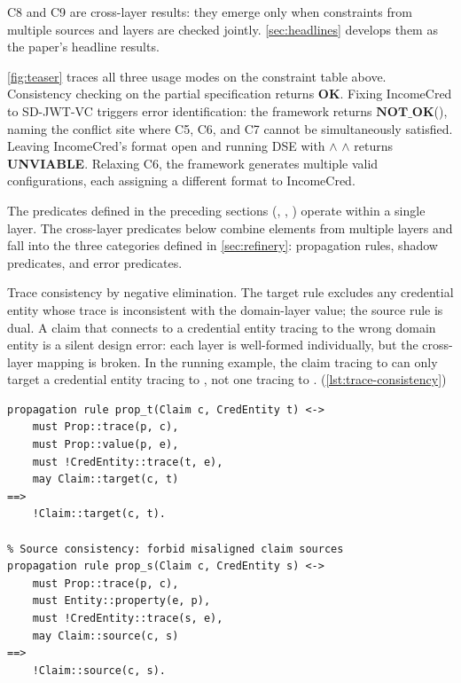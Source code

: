 C8 and C9 are cross-layer results: they emerge only when constraints from multiple sources and layers are checked jointly. \autoref{sec:headlines} develops them as the paper's headline results.

\autoref{fig:teaser} traces all three usage modes on the constraint table above. Consistency checking on the partial specification returns \textbf{OK}. Fixing IncomeCred to SD-JWT-VC triggers error identification: the framework returns \(\textbf{NOT\_OK}\)(), naming the conflict site where C5, C6, and C7 cannot be simultaneously satisfied. Leaving IncomeCred's format open and running \ac{DSE} with  \(\wedge\)  \(\wedge\)  returns \textbf{UNVIABLE}. Relaxing C6, the framework generates multiple valid configurations, each assigning a different format to IncomeCred.

The predicates defined in the preceding sections (, , ) operate within a single layer. The cross-layer predicates below combine elements from multiple layers and fall into the three categories defined in \autoref{sec:refinery}: propagation rules, shadow predicates, and error predicates.

\begin{description}
\tightlist
\item[prop\_t, prop\_s: propagation rules (C2)]
Trace consistency by negative elimination. The target rule  excludes any credential entity whose trace is inconsistent with the domain-layer value; the source rule  is dual. A claim that connects to a credential entity tracing to the wrong domain entity is a silent design error: each layer is well-formed individually, but the cross-layer mapping is broken. In the running example, the claim tracing to  can only target a credential entity tracing to , not one tracing to . (\autoref{lst:trace-consistency})
\end{description}

\begin{lstlisting}[style=refinery, caption={Cross-layer trace consistency: negative elimination rules}, label=lst:trace-consistency]
% Target consistency: forbid misaligned claim targets
propagation rule prop_t(Claim c, CredEntity t) <->
    must Prop::trace(p, c),
    must Prop::value(p, e),
    must !CredEntity::trace(t, e),
    may Claim::target(c, t)
==>
    !Claim::target(c, t).

% Source consistency: forbid misaligned claim sources
propagation rule prop_s(Claim c, CredEntity s) <->
    must Prop::trace(p, c),
    must Entity::property(e, p),
    must !CredEntity::trace(s, e),
    may Claim::source(c, s)
==>
    !Claim::source(c, s).
\end{lstlisting}

